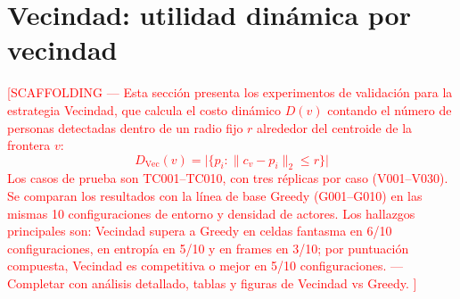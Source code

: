 \section{Vecindad: utilidad dinámica por vecindad}
\label{sec:exp_e1}

\textcolor{red}{%
[SCAFFOLDING --- Esta sección presenta los experimentos de validación para la estrategia Vecindad, que calcula el costo dinámico $D(v)$ contando el número de personas detectadas dentro de un radio fijo $r$ alrededor del centroide de la frontera $v$:
\[
    D_{\text{Vec}}(v) = \bigl|\{ p_i : \| c_v - p_i \|_2 \leq r \}\bigr|
\]
Los casos de prueba son TC001–TC010, con tres réplicas por caso (V001–V030). Se comparan los resultados con la línea de base Greedy (G001–G010) en las mismas 10 configuraciones de entorno y densidad de actores.
Los hallazgos principales son: Vecindad supera a Greedy en celdas fantasma en 6/10 configuraciones, en entropía en 5/10 y en frames en 3/10; por puntuación compuesta, Vecindad es competitiva o mejor en 5/10 configuraciones.
--- Completar con análisis detallado, tablas y figuras de Vecindad vs Greedy.%
]}

